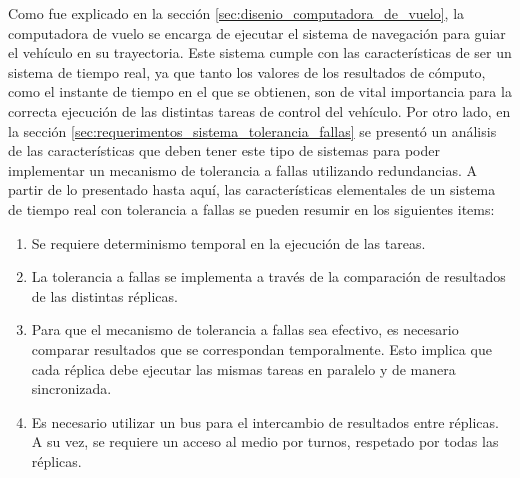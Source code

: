 
Como fue explicado en la sección \ref{sec:disenio_computadora_de_vuelo}, la computadora de vuelo se encarga de ejecutar el sistema de navegación para guiar el vehículo en su trayectoria. Este sistema cumple con las características de ser un sistema de tiempo real, ya que tanto los valores de los resultados de cómputo, como el instante de tiempo en el que se obtienen, son de vital importancia para la correcta ejecución de las distintas tareas de control del vehículo. 
Por otro lado, en la sección \ref{sec:requerimentos_sistema_tolerancia_fallas} se presentó un análisis de las características que deben tener este tipo de sistemas para poder implementar un mecanismo de tolerancia a fallas utilizando redundancias. A partir de lo presentado hasta aquí, las características elementales de un sistema de tiempo real con tolerancia a fallas se pueden resumir en los siguientes items:


\begin{enumerate}
    \item Se requiere determinismo temporal en la ejecución de las tareas.
    \item La tolerancia a fallas se implementa a través de la comparación de resultados de las distintas réplicas.
    \item Para que el mecanismo de tolerancia a fallas sea efectivo, es necesario comparar resultados que se correspondan temporalmente. Esto implica que cada réplica debe ejecutar las mismas tareas en paralelo y de manera sincronizada.
    \item Es necesario utilizar un bus para el intercambio de resultados entre réplicas. A su vez, se requiere un acceso al medio por turnos, respetado por todas las réplicas.
\end{enumerate}

